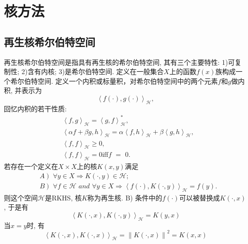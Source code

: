 \documentclass[lang=cn,10pt]{gorgeousnbook}
\numberwithin{equation}{section}%
\numberwithin{figure}{section}%
\begin{document}
 


\chapter{核方法}
\section{再生核希尔伯特空间}
再生核希尔伯特空间是指具有再生核的希尔伯特空间, 其有三个主要特性: 1)可复制性; 2)含有内核; 3)是希尔伯特空间. 
定义在一般集合$X$上的函数$f(x)$族构成一个希尔伯特空间. 定义一个内积或标量积，对希尔伯特空间中的两个元素$f$和$g$做内积, 并表示为
\begin{equation}
\left< f\left( \cdot \right) ,g\left( \cdot \right) \right> _{\mathcal{H}},
\end{equation}
回忆内积的若干性质:
\begin{equation}
\begin{aligned}
& \left< f,g \right> _{\mathcal{H}}=\left< g,f \right> _{\mathcal{H}}^{*},\\
& \left< \alpha f+\beta g,h \right> _{\mathcal{H}}=\alpha \left< f,h \right> _{\mathcal{H}}+\beta \left< g,h \right> _{\mathcal{H}},\\
& \left< f,f \right> _{\mathcal{H}}\geqslant 0,\\
& \left< f,f \right> _{\mathcal{H}}=0 \mathrm{iff} f\,\,=\,\,0.
\end{aligned}
\end{equation}
若存在一个定义在$X\times X$上的核$K(x,y)$满足
\begin{equation}
\begin{aligned}
& \left. A \right) \,\,\forall y\in X\Rightarrow K\left( \cdot ,y \right) \in \mathcal{H} ; \\
& \left. B \right) \,\,\forall f\in \mathcal{H} \,\,and\,\,\forall y\in X\Rightarrow \left< f\left( \cdot \right) ,K\left( \cdot ,y \right) \right> _{\mathcal{H}}=f\left( y \right) .
\end{aligned}
\end{equation}
则这个空间$\mathcal{H}$是RKHS, 核$K$称为再生核. B) 条件中的$f(\cdot)$可以被替换成$ K\left( \cdot ,x \right)$, 于是有
\begin{equation}
\left< K\left( \cdot ,x \right) ,K\left( \cdot ,y \right) \right> _{\mathcal{H}}=K\left( y,x \right) 
\end{equation}
当$x=y$时, 有
\begin{equation}
\left< K\left( \cdot ,x \right) ,K\left( \cdot ,x \right) \right> _{\mathcal{H}}=\left\| K\left( \cdot ,x \right) \right\| ^2=K\left( x,x \right) 
\end{equation}
\end{document}

